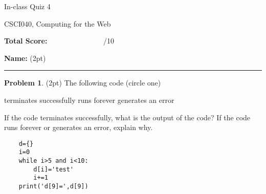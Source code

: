 \documentclass[10pt]{article}
\theoremstyle{definition}
\newtheorem{problem}{Problem}
\begin{document}
\begin{center}
    {
\Large
In-class Quiz 4
}

    \vspace{0.1in}
CSCI040, Computing for the Web

    \vspace{0.1in}
\end{center}

\vspace{0.25in}
\noindent
\textbf{Total Score:} ~~~~~~~~~~~~~~~/10

\vspace{0.5in}
\noindent
\textbf{Name:} (2pt)

\noindent
\rule{\textwidth}{0.1pt}
\vspace{0.25in}

\begin{problem}
    (2pt)
    The following code (circle one)
    
    \vspace{0.25in}
    \hspace{0.5in}terminates successfully
    \hspace{1in}runs forever
    \hspace{1in}generates an error
    \vspace{0.25in}

    \noindent
    If the code terminates successfully, what is the output of the code?
    If the code runs forever or generates an error, explain why.
\end{problem}
\begin{lstlisting}
    d={}
    i=0
    while i>5 and i<10:
        d[i]='test'
        i+=1
    print('d[9]=',d[9])
\end{lstlisting}
\vspace{1.5in}
\end{document}
